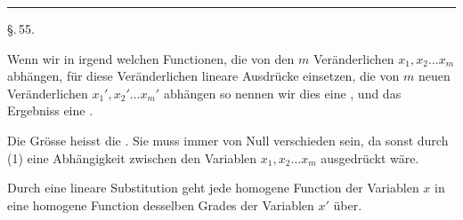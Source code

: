 
\begin{center}


\rule{0.3\linewidth}{0.4pt}

\S.\,55.

\end{center}

Wenn wir in irgend welchen Functionen, die von den $m$ Veränderlichen $x_1, x_2 \ldots x_m$ abhängen, für diese Veränderlichen lineare Ausdrücke einsetzen, die von $m$ neuen Veränderlichen $x_1', x_2' \ldots x_m'$ abhängen
so nennen wir dies eine , und das Ergebniss eine .

Die Grösse
heisst die . Sie muss immer von Null verschieden sein, da sonst durch (1) eine Abhängigkeit zwischen den Variablen $x_1, x_2 \ldots x_m$ ausgedrückt wäre.

Durch eine lineare Substitution geht jede homogene Function der Variablen $x$ in eine homogene Function desselben Grades der Variablen $x'$ über.
